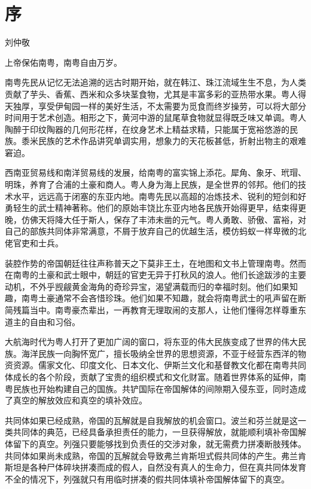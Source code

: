
\chapter*{序}

\begin{flushright}
	刘仲敬
\end{flushright}

\begin{quoted}
	上帝保佑南粤，南粤自由万岁。
\end{quoted}

南粤先民从记忆无法追溯的远古时期开始，就在韩江、珠江流域生生不息，为人类贡献了芋头、香蕉、西米和众多块茎食物，尤其是丰富多彩的亚热带水果。粤人得天独厚，享受伊甸园一样的美好生活，不太需要为觅食而终岁操劳，可以将大部分时间用于艺术创造。相形之下，黄河中游的鼠尾草食物就显得既乏味又单调。粤人陶醉于印纹陶器的几何形花样，在纹身艺术上精益求精，只能属于宽裕悠游的民族。黍米民族的艺术作品讲究单调实用，想象力的天花板甚低，折射出物主的艰难窘迫。

西南亚贸易线和南洋贸易线的发展，给南粤的富实锦上添花。犀角、象牙、玳瑁、明珠，养育了合浦的土豪和商人。粤人身为海上民族，是全世界的邻邦。他们的技术水平，远远高于闭塞的东亚内地。南粤先民以高超的冶炼技术、锐利的短剑和好勇轻生的武士精神著称。他们的原始丰饶比东亚内地各民族开始得更早，结束得更晚，仿佛天将降大任于斯人，保存了丰沛未凿的元气。粤人勇敢、骄傲、富裕，对自己的部族共同体非常满意，不屑于放弃自己的优越生活，模仿蚂蚁一样卑微的北佬官吏和士兵。

装腔作势的帝国朝廷往往声称普天之下莫非王土，在地图和文书上管理南粤。然而在南粤的土豪和武士眼中，朝廷的官吏无异于打秋风的浪人。他们长途跋涉的主要动机，不外乎觊觎黄金海角的奇珍异宝，渴望满载而归的幸福时刻。他们如果知趣，南粤土豪通常不会吝惜珍珠。他们如果不知趣，就会将南粤武士的吼声留在断简残篇当中。南粤豪杰辈出，一再教育无理取闹的支那人，让他们懂得怎样尊重东道主的自由和习俗。

大航海时代为粤人打开了更加广阔的窗口，将东亚的伟大民族变成了世界的伟大民族。海洋民族一向胸怀宽广，擅长吸纳全世界的思想资源，不亚于经营东西洋的物资资源。儒家文化、印度文化、日本文化、伊斯兰文化和基督教文化都在南粤共同体成长的各个阶段，贡献了宝贵的组织模式和文化财富。随着世界体系的延伸，南粤民族也开始构建自己的国族。共铲国际在帝国解体的间隙期入侵东亚，同时造成了真空的解放效应和真空的填补效应。

共同体如果已经成熟，帝国的瓦解就是自我解放的机会窗口。波兰和芬兰就是这一类共同体的典范，已经具备承担责任的能力，一旦获得解放，就能顺利填补帝国解体留下的真空。列强只要能够找到负责任的交涉对象，就无需费力拼凑断肢残体。共同体如果尚未成熟，帝国的瓦解就会导致弗兰肯斯坦式假共同体的产生。弗兰肯斯坦是各种尸体碎块拼凑而成的假人，自然没有真人的生命力，但在真共同体发育不全的情况下，列强就只有用临时拼凑的假共同体填补帝国解体留下的真空。

